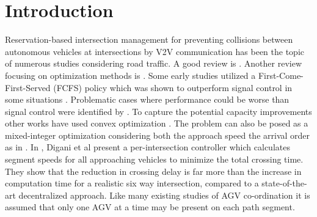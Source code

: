 \section{Introduction}

Reservation-based intersection management for preventing collisions between autonomous vehicles at intersections by V2V communication has been the topic of numerous studies considering road traffic. A good review is \cite{Chen2016}. Another review focusing on optimization methods is \cite{Malikopoulos2018}. Some early studies utilized a First-Come-First-Served (FCFS) policy which was shown to outperform signal control in some situations \cite{Dresner2008}. Problematic cases where performance could be worse than signal control were identified by \cite{Levin2016}. To capture the potential capacity improvements other works have used convex optimization \cite{Dai2017}.
The problem can also be posed as a mixed-integer optimization considering both the approach speed the arrival order as in \cite{Levin2017}.  
In \cite{Digani2019}, Digani et al present a per-intersection controller which calculates segment speeds for all approaching vehicles to minimize the total crossing time. They show that the reduction in crossing delay is far more than the increase in computation time for a realistic six way intersection, compared to a state-of-the-art decentralized approach. Like many existing studies of AGV co-ordination it is assumed that only one AGV at a time may be present on each path segment.
%
%    
%    


  


%
%


